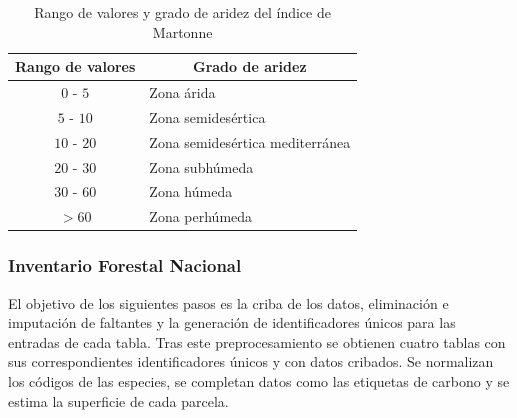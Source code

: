 \begin{table}[H]
\centering
\begin{tabular}{|c|l|}
\hline
\rowcolor[HTML]{D9EAD3} 
Rango de valores & \multicolumn{1}{c|}{\cellcolor[HTML]{D9EAD3}Grado de aridez} \\ \hline
$0$ - $5$        & Zona árida                                                   \\
$5$ - $10$       & Zona semidesértica                                           \\
$10$ - $20$      & Zona semidesértica mediterránea                              \\
$20$ - $30$      & Zona subhúmeda                                               \\
$30$ - $60$      & Zona húmeda                                                  \\
$\gt 60$         & Zona perhúmeda                                               \\ \hline
\end{tabular}
\caption{Rango de valores y grado de aridez del índice de Martonne}
\label{tab:indice_martonne}
\end{table}




\subsubsection{Inventario Forestal Nacional}

El objetivo de los siguientes pasos es la criba de los datos, eliminación e imputación de faltantes y la generación de identificadores únicos para las entradas de cada tabla. Tras este preprocesamiento se obtienen cuatro tablas con sus correspondientes identificadores únicos y con datos cribados. Se normalizan los códigos de las especies, se completan datos como las etiquetas de carbono y se estima la superficie de cada parcela.


